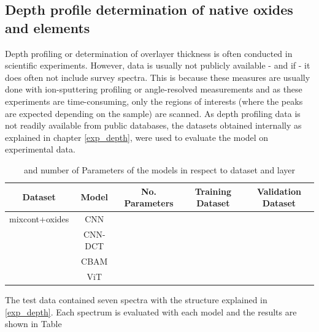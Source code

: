 \subsection{Depth profile determination of native oxides and elements}

Depth profiling or determination of overlayer thickness is often conducted in scientific experiments. However, data is usually not publicly available - and if - it does often not include survey spectra. This is because these measures are usually done with ion-sputtering profiling or angle-resolved measurements and as these experiments are time-consuming, only the regions of interests (where the peaks are expected depending on the sample) are scanned.
As depth profiling data is not readily available from public databases, the datasets obtained internally as explained in chapter \ref{exp_depth}, were used to evaluate the model on experimental data.

\begin{table}[H]
    \centering
    \begin{tabular}{c|c|c|c|c}
        Dataset & Model   & No. Parameters & Training Dataset    & Validation Dataset    \\
        \hline
 mixcont+oxides& CNN     &                &                       &                         \\
               & CNN-DCT &                &                       &                         \\
               & CBAM    &                &                       &                         \\
               & ViT     &                &                       &                         \\

    \end{tabular}
    \caption{ and number of Parameters of the models in respect to dataset and layer}
    \label{tab:acc_depth}
\end{table}

The test data contained seven spectra with the structure explained in \ref{exp_depth}. Each spectrum is evaluated with each model and the results are shown in Table 


